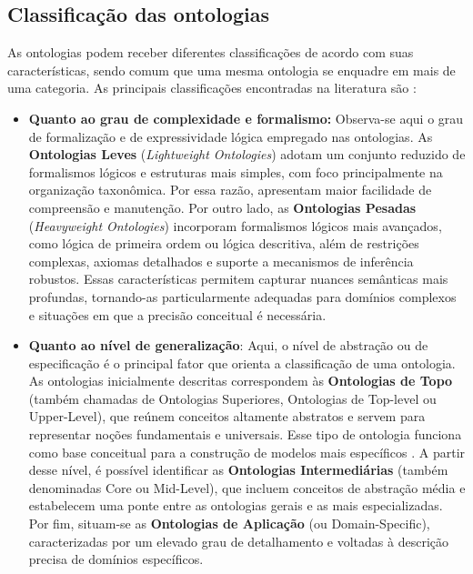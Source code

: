 \subsection{Classificação das ontologias}
As ontologias podem receber diferentes classificações de acordo com suas características, sendo comum que uma mesma ontologia se enquadre em mais de uma categoria. As principais classificações encontradas na literatura são \cite{isotani2015ontologias} \cite{gomez2004ontological}:
\begin{itemize}
    \item \textbf{Quanto ao grau de complexidade e formalismo:} Observa-se aqui o grau de formalização e de expressividade lógica empregado nas ontologias. As \textbf{Ontologias Leves} (\textit{Lightweight Ontologies}) adotam um conjunto reduzido de formalismos lógicos e estruturas mais simples, com foco principalmente na organização taxonômica. Por essa razão, apresentam maior facilidade de compreensão e manutenção. Por outro lado, as \textbf{Ontologias Pesadas} (\textit{Heavyweight Ontologies}) incorporam formalismos lógicos mais avançados, como lógica de primeira ordem ou lógica descritiva, além de restrições complexas, axiomas detalhados e suporte a mecanismos de inferência robustos. Essas características permitem capturar nuances semânticas mais profundas, tornando-as particularmente adequadas para domínios complexos e situações em que a precisão conceitual é necessária.
    \item \textbf{Quanto ao nível de generalização}: Aqui, o nível de abstração ou de especificação é o principal fator que orienta a classificação de uma ontologia. As ontologias inicialmente descritas correspondem às \textbf{Ontologias de Topo} (também chamadas de Ontologias Superiores, Ontologias de Top-level ou Upper-Level), que reúnem conceitos altamente abstratos e servem para representar noções fundamentais e universais. Esse tipo de ontologia funciona como base conceitual para a construção de modelos mais específicos \cite{isotani2015ontologias}. A partir desse nível, é possível identificar as \textbf{Ontologias Intermediárias} (também denominadas Core ou Mid-Level), que incluem conceitos de abstração média e estabelecem uma ponte entre as ontologias gerais e as mais especializadas. Por fim, situam-se as \textbf{Ontologias de Aplicação} (ou Domain-Specific), caracterizadas por um elevado grau de detalhamento e voltadas à descrição precisa de domínios específicos.

\end{itemize}

